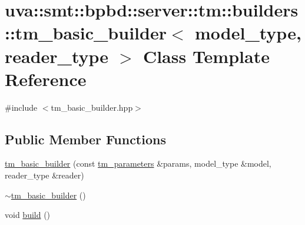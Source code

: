 \hypertarget{classuva_1_1smt_1_1bpbd_1_1server_1_1tm_1_1builders_1_1tm__basic__builder}{}\section{uva\+:\+:smt\+:\+:bpbd\+:\+:server\+:\+:tm\+:\+:builders\+:\+:tm\+\_\+basic\+\_\+builder$<$ model\+\_\+type, reader\+\_\+type $>$ Class Template Reference}
\label{classuva_1_1smt_1_1bpbd_1_1server_1_1tm_1_1builders_1_1tm__basic__builder}


{\ttfamily \#include $<$tm\+\_\+basic\+\_\+builder.\+hpp$>$}

\subsection*{Public Member Functions}
\begin{DoxyCompactItemize}
\item 
\hyperlink{classuva_1_1smt_1_1bpbd_1_1server_1_1tm_1_1builders_1_1tm__basic__builder_a3acde5a466b7d9e97e4cf7ffdc72dd87}{tm\+\_\+basic\+\_\+builder} (const \hyperlink{structuva_1_1smt_1_1bpbd_1_1server_1_1tm_1_1tm__parameters}{tm\+\_\+parameters} \&params, model\+\_\+type \&model, reader\+\_\+type \&reader)
\item 
\hyperlink{classuva_1_1smt_1_1bpbd_1_1server_1_1tm_1_1builders_1_1tm__basic__builder_aaf4afc4e2bbb2a675a64603ceecdc8e9}{$\sim$tm\+\_\+basic\+\_\+builder} ()
\item 
void \hyperlink{classuva_1_1smt_1_1bpbd_1_1server_1_1tm_1_1builders_1_1tm__basic__builder_a07847280269c80b4e7d622da3e654c8e}{build} ()
\end{DoxyCompactItemize}
